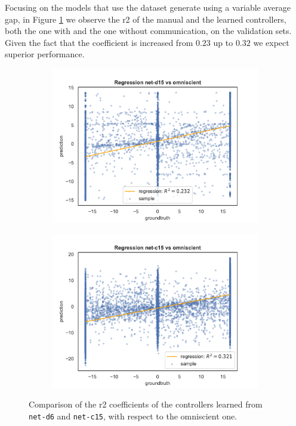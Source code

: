 Focusing on the models that use the dataset generate using a variable average 
gap, in Figure \ref{fig:net-c15r2} we observe the \gls{r2} of the manual and the 
learned controllers, both the one with and the one without communication, on 
the validation sets.
Given the fact that the coefficient is increased from $0.23$ up to $0.32$ we 
expect superior performance.  
\begin{figure}[!htb]
	\begin{center}
		\begin{subfigure}[h]{0.49\textwidth}
			\includegraphics[width=\textwidth]{contents/images/net-d15/regression-net-d15-vs-omniscient}%
		\end{subfigure}
		\hfill\vspace{-0.5cm}
		\begin{subfigure}[h]{0.49\textwidth}
			\includegraphics[width=\textwidth]{contents/images/net-c15/regression-net-c15-vs-omniscient}%
		\end{subfigure}
	\end{center}
	\caption[Evaluation of the \gls{r2} coefficients of \texttt{net-c15}.]{Comparison 
		of the \gls{r2} coefficients of the controllers learned from 
		\texttt{net-d6} and \texttt{net-c15}, with respect to the omniscient one.}
	\label{fig:net-c15r2}
\end{figure}

